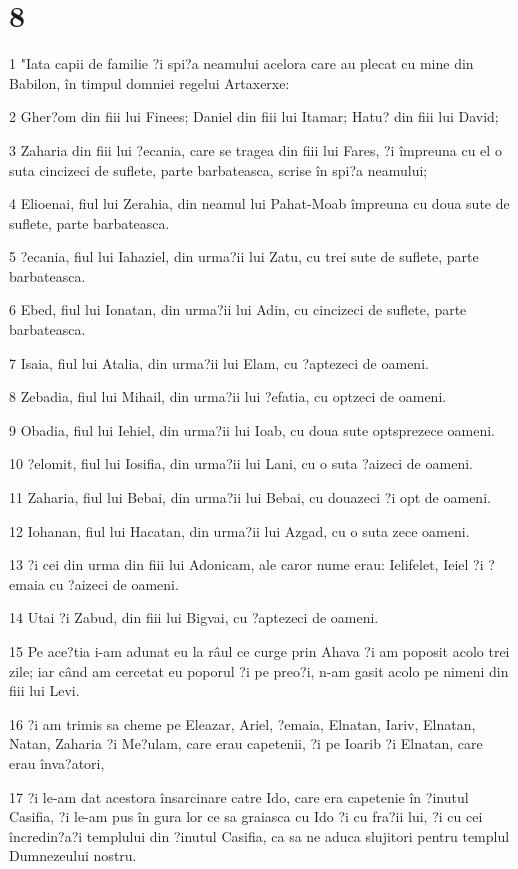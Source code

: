 \chapter{8}

\par 1 "Iata capii de familie ?i spi?a neamului acelora care au plecat cu mine din Babilon, în timpul domniei regelui Artaxerxe:
\par 2 Gher?om din fiii lui Finees; Daniel din fiii lui Itamar; Hatu? din fiii lui David;
\par 3 Zaharia din fiii lui ?ecania, care se tragea din fiii lui Fares, ?i împreuna cu el o suta cincizeci de suflete, parte barbateasca, scrise în spi?a neamului;
\par 4 Elioenai, fiul lui Zerahia, din neamul lui Pahat-Moab împreuna cu doua sute de suflete, parte barbateasca.
\par 5 ?ecania, fiul lui Iahaziel, din urma?ii lui Zatu, cu trei sute de suflete, parte barbateasca.
\par 6 Ebed, fiul lui Ionatan, din urma?ii lui Adin, cu cincizeci de suflete, parte barbateasca.
\par 7 Isaia, fiul lui Atalia, din urma?ii lui Elam, cu ?aptezeci de oameni.
\par 8 Zebadia, fiul lui Mihail, din urma?ii lui ?efatia, cu optzeci de oameni.
\par 9 Obadia, fiul lui Iehiel, din urma?ii lui Ioab, cu doua sute optsprezece oameni.
\par 10 ?elomit, fiul lui Iosifia, din urma?ii lui Lani, cu o suta ?aizeci de oameni.
\par 11 Zaharia, fiul lui Bebai, din urma?ii lui Bebai, cu douazeci ?i opt de oameni.
\par 12 Iohanan, fiul lui Hacatan, din urma?ii lui Azgad, cu o suta zece oameni.
\par 13 ?i cei din urma din fiii lui Adonicam, ale caror nume erau: Ielifelet, Ieiel ?i ?emaia cu ?aizeci de oameni.
\par 14 Utai ?i Zabud, din fiii lui Bigvai, cu ?aptezeci de oameni.
\par 15 Pe ace?tia i-am adunat eu la râul ce curge prin Ahava ?i am poposit acolo trei zile; iar când am cercetat eu poporul ?i pe preo?i, n-am gasit acolo pe nimeni din fiii lui Levi.
\par 16 ?i am trimis sa cheme pe Eleazar, Ariel, ?emaia, Elnatan, Iariv, Elnatan, Natan, Zaharia ?i Me?ulam, care erau capetenii, ?i pe Ioarib ?i Elnatan, care erau înva?atori,
\par 17 ?i le-am dat acestora însarcinare catre Ido, care era capetenie în ?inutul Casifia, ?i le-am pus în gura lor ce sa graiasca cu Ido ?i cu fra?ii lui, ?i cu cei încredin?a?i templului din ?inutul Casifia, ca sa ne aduca slujitori pentru templul Dumnezeului nostru.
